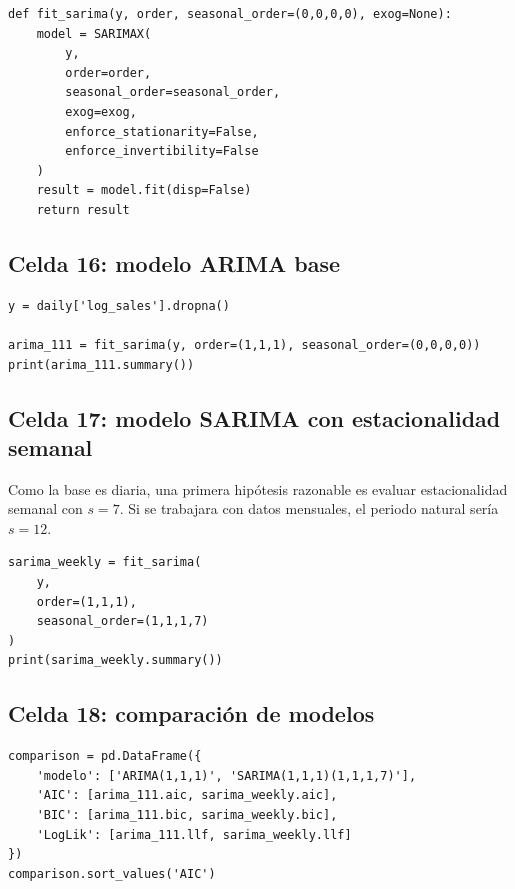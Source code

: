 \documentclass[11pt,letterpaper]{article}
\begin{document}
\begin{lstlisting}[style=pythoncolab]
def fit_sarima(y, order, seasonal_order=(0,0,0,0), exog=None):
    model = SARIMAX(
        y,
        order=order,
        seasonal_order=seasonal_order,
        exog=exog,
        enforce_stationarity=False,
        enforce_invertibility=False
    )
    result = model.fit(disp=False)
    return result
\end{lstlisting}

\subsection{Celda 16: modelo ARIMA base}

\begin{lstlisting}[style=pythoncolab]
y = daily['log_sales'].dropna()

arima_111 = fit_sarima(y, order=(1,1,1), seasonal_order=(0,0,0,0))
print(arima_111.summary())
\end{lstlisting}

\subsection{Celda 17: modelo SARIMA con estacionalidad semanal}

\begin{markdowncell}
Como la base es diaria, una primera hipótesis razonable es evaluar estacionalidad semanal con \(s=7\). Si se trabajara con datos mensuales, el periodo natural sería \(s=12\).
\end{markdowncell}

\begin{lstlisting}[style=pythoncolab]
sarima_weekly = fit_sarima(
    y,
    order=(1,1,1),
    seasonal_order=(1,1,1,7)
)
print(sarima_weekly.summary())
\end{lstlisting}

\subsection{Celda 18: comparación de modelos}

\begin{lstlisting}[style=pythoncolab]
comparison = pd.DataFrame({
    'modelo': ['ARIMA(1,1,1)', 'SARIMA(1,1,1)(1,1,1,7)'],
    'AIC': [arima_111.aic, sarima_weekly.aic],
    'BIC': [arima_111.bic, sarima_weekly.bic],
    'LogLik': [arima_111.llf, sarima_weekly.llf]
})
comparison.sort_values('AIC')
\end{lstlisting}
\end{document}
